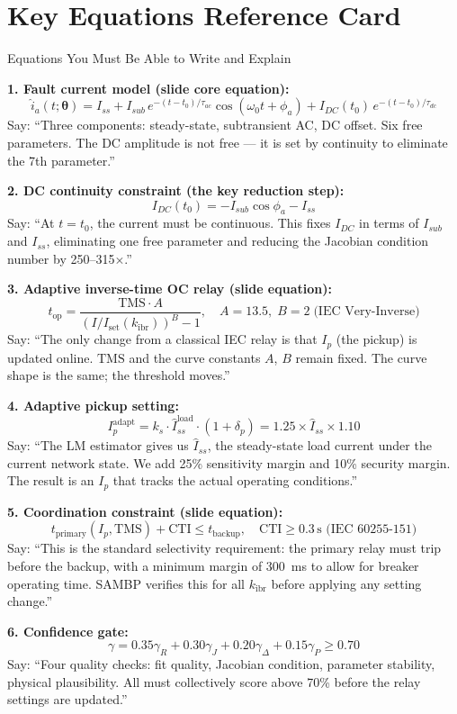 \documentclass[12pt,a4paper]{article}
\newcommand{\kibr}{k_\mathrm{ibr}}
\newcommand{\TMS}{\mathrm{TMS}}
\newcommand{\Iset}{I_\mathrm{set}}
\newcommand{\Ip}{I_p}
\newcommand{\tops}{t_\mathrm{op}}
\newcommand{\tpri}{t_\mathrm{primary}}
\newcommand{\tbak}{t_\mathrm{backup}}
\newcommand{\CTI}{\mathrm{CTI}}
\begin{document}
\section{Key Equations Reference Card}

\begin{formulabox}{Equations You Must Be Able to Write and Explain}

\textbf{1. Fault current model (slide core equation):}
\[
  \hat{i}_a(t;\bm{\theta}) = I_{ss} + I_{sub}\,e^{-(t-t_0)/\tau_{ac}}\cos(\omega_0 t + \phi_a)
    + I_{DC}(t_0)\,e^{-(t-t_0)/\tau_{dc}}
\]
Say: ``Three components: steady-state, subtransient AC, DC offset. Six free parameters. The DC amplitude is not free --- it is set by continuity to eliminate the 7th parameter.''

\textbf{2. DC continuity constraint (the key reduction step):}
\[
  I_{DC}(t_0) = -I_{sub}\cos\phi_a - I_{ss}
\]
Say: ``At $t = t_0$, the current must be continuous. This fixes $I_{DC}$ in terms of $I_{sub}$ and $I_{ss}$, eliminating one free parameter and reducing the Jacobian condition number by 250--315$\times$.''

\textbf{3. Adaptive inverse-time OC relay (slide equation):}
\[
  \tops = \frac{\TMS \cdot A}{\left(I/\Iset(\kibr)\right)^B - 1}, \quad A=13.5,\; B=2 \;\text{(IEC Very-Inverse)}
\]
Say: ``The only change from a classical IEC relay is that $I_p$ (the pickup) is updated online. $\TMS$ and the curve constants $A$, $B$ remain fixed. The curve shape is the same; the threshold moves.''

\textbf{4. Adaptive pickup setting:}
\[
  \Ip^\mathrm{adapt} = k_s \cdot \hat{I}_{ss}^\mathrm{load} \cdot (1 + \delta_p)
    = 1.25 \times \hat{I}_{ss} \times 1.10
\]
Say: ``The LM estimator gives us $\hat{I}_{ss}$, the steady-state load current under the current network state. We add 25\% sensitivity margin and 10\% security margin. The result is an $I_p$ that tracks the actual operating conditions.''

\textbf{5. Coordination constraint (slide equation):}
\[
  \tpri(\Ip, \TMS) + \CTI \leq \tbak, \quad \CTI \geq 0.3\,\text{s (IEC~60255-151)}
\]
Say: ``This is the standard selectivity requirement: the primary relay must trip before the backup, with a minimum margin of 300~ms to allow for breaker operating time. SAMBP verifies this for all $\kibr$ before applying any setting change.''

\textbf{6. Confidence gate:}
\[
  \gamma = 0.35\gamma_R + 0.30\gamma_J + 0.20\gamma_\Delta + 0.15\gamma_P \geq 0.70
\]
Say: ``Four quality checks: fit quality, Jacobian condition, parameter stability, physical plausibility. All must collectively score above 70\% before the relay settings are updated.''
\end{formulabox}
\end{document}
